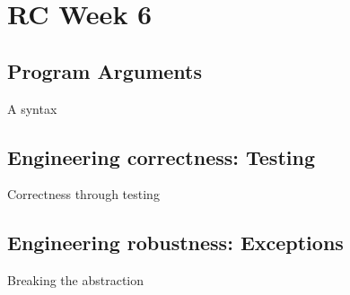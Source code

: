 \section{RC Week 6}
\subsection{Program Arguments}
\begin{frame}{A syntax}
\end{frame}

\subsection{Engineering correctness: Testing}
\begin{frame}{Correctness through testing}

\end{frame}
\subsection{Engineering robustness: Exceptions}
\begin{frame}{Breaking the abstraction}

\end{frame}
